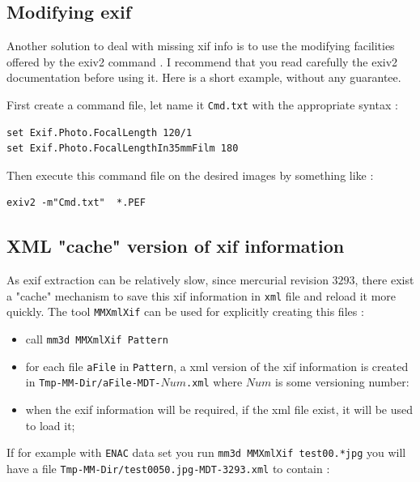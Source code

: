 \subsection{Modifying  exif}

Another solution to deal with missing xif info is to use the
modifying facilities offered by the  exiv2 command .
I recommend that you read carefully
the exiv2 documentation before using it. Here is a short example,
without  any guarantee.

First create a command file, let name it {\tt Cmd.txt} with the appropriate syntax :

\begin{verbatim}
set Exif.Photo.FocalLength 120/1
set Exif.Photo.FocalLengthIn35mmFilm 180
\end{verbatim}

Then execute this command file on the desired images by something like :

\begin{verbatim}
exiv2 -m"Cmd.txt"  *.PEF
\end{verbatim}



\subsection{XML "cache" version of xif information}

As exif extraction can be relatively slow, since mercurial revision $3293$, there exist a
"cache" mechanism to save this xif information in {\tt xml} file and reload it more quickly.
The tool {\tt MMXmlXif} can be used for explicitly creating this files :

\begin{itemize}
   \item call {\tt mm3d MMXmlXif Pattern}
   \item  for each file {\tt aFile} in {\tt Pattern}, a xml version of the xif information is created in
          {\tt Tmp-MM-Dir/aFile-MDT-$Num$.xml}  where $Num$ is some versioning number:
    \item when the exif information will be required, if the  xml file exist, it will be used to load it;
\end{itemize}

If for example with {\tt ENAC} data set you run {\tt mm3d MMXmlXif test00.*jpg}
you will have a file {\tt Tmp-MM-Dir/test0050.jpg-MDT-3293.xml} to contain :


